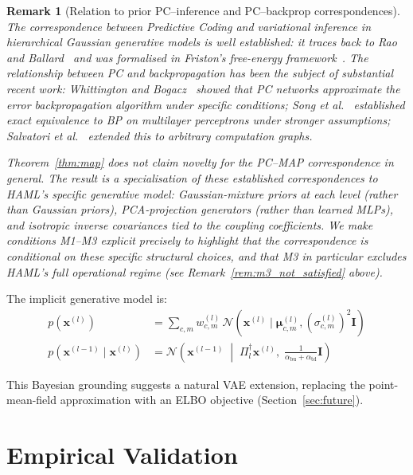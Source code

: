 \documentclass[11pt,a4paper]{article}
\newtheorem{remark}[theorem]{Remark}
\begin{document}
\begin{remark}[Relation to prior PC--inference and PC--backprop correspondences]
\label{rem:map_priorwork}
The correspondence between Predictive Coding and variational inference in hierarchical
Gaussian generative models is well established: it traces back to Rao and
Ballard~\cite{rao1999predictive} and was formalised in Friston's free-energy
framework~\cite{friston2005theory}. The relationship between PC and backpropagation
has been the subject of substantial recent work: Whittington and
Bogacz~\cite{whittington2017approximation} showed that PC networks approximate the
error backpropagation algorithm under specific conditions; Song et
al.~\cite{song2020can} established exact equivalence to BP on multilayer perceptrons
under stronger assumptions; Salvatori et al.~\cite{salvatori2021exactbp} extended this
to arbitrary computation graphs.

Theorem~\ref{thm:map} does \emph{not} claim novelty for the PC--MAP correspondence in
general. The result is a \emph{specialisation} of these established correspondences to
HAML's specific generative model: Gaussian-mixture priors at each level (rather than
Gaussian priors), PCA-projection generators (rather than learned MLPs), and isotropic
inverse covariances tied to the coupling coefficients. We make conditions M1--M3
explicit precisely to highlight that the correspondence is conditional on these
specific structural choices, and that M3 in particular excludes HAML's full operational
regime (see Remark~\ref{rem:m3_not_satisfied} above).
\end{remark}

The implicit generative model is:
\begin{align}
  p(\mathbf{x}^{(l)}) &=
    \sum_{c,m} w^{(l)}_{c,m}\, \mathcal{N}(\mathbf{x}^{(l)} \mid \boldsymbol{\mu}^{(l)}_{c,m},
    (\sigma^{(l)}_{c,m})^2\mathbf{I}) \\
  p(\mathbf{x}^{(l-1)} \mid \mathbf{x}^{(l)}) &=
    \mathcal{N}\!\left(\mathbf{x}^{(l-1)} \;\middle|\; \Pi_l^\dagger \mathbf{x}^{(l)},\;
    \tfrac{1}{\alpha_{\mathrm{bu}}+\alpha_{\mathrm{td}}}\mathbf{I}\right)
\end{align}

This Bayesian grounding suggests a natural VAE extension, replacing the point-mean-field
approximation with an ELBO objective (Section~\ref{sec:future}).

\section{Empirical Validation}
\end{document}
